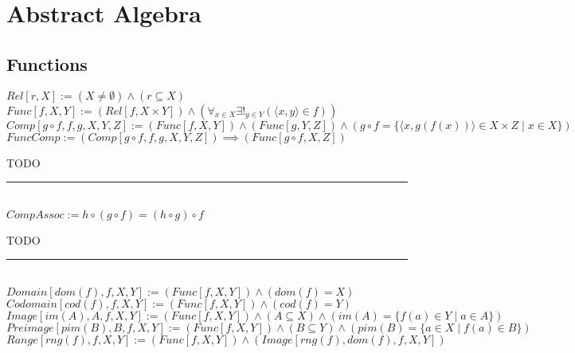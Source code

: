 \documentclass{book}
\newcommand{\abr}{:=}
\newcommand{\st}{\mathbin{|}}
\newcommand{\utup}[1]{\{#1\}}
\begin{document}
\begin{comment}
$ComponentEquiv \abr ((Component[W, G]) \land (x \in W)) \implies
\left(\begin{array}{ll}
  (W = \{y \in V(G) \st \exists_{P, V}(PathXY[P, (x, y), V, G])\}) \hfill \land \hfill \\
  (W = \{y \in V(G) \st d(x, y) \in \mathbb{N}\}) \hfill \land \hfill \\
  ((R = \{\langle u, v \rangle \st \utup{u, v} \in E(G)\}) \land (W = [x]_R)) \\
\end{array}\right)$ \\
\end{comment}



\newpage
\newpage
\newpage


\chapter{Abstract Algebra}
\section{Functions}
$Rel[r, X] \abr (X \neq \emptyset) \land (r \subseteq X)$ \\
$Func[f, X, Y] \abr (Rel[f, X \times Y]) \land (\forall_{x \in X} \exists!_{y \in Y}(\langle x, y \rangle \in f))$ \\
$Comp[g \circ f, f, g, X, Y, Z] \abr (Func[f, X, Y]) \land (Func[g, Y, Z]) \land (g \circ f = \{\langle x, g(f(x)) \rangle \in X \times Z \st x \in X\})$ \\

$FuncComp \abr (Comp[g \circ f, f, g, X, Y, Z]) \implies (Func[g \circ f, X, Z])$
\begin{enumerate}
  \lit TODO
\end{enumerate} \vspace{.75mm} \hrule \vspace{.75mm} \ \\

$CompAssoc \abr h \circ (g \circ f) = (h \circ g) \circ f$
\begin{enumerate}
  \lit TODO
\end{enumerate} \vspace{.75mm} \hrule \vspace{.75mm} \ \\

$Domain[dom(f), f, X, Y] \abr (Func[f, X, Y]) \land (dom(f) = X)$ \\
$Codomain[cod(f), f, X, Y] \abr (Func[f, X, Y]) \land (cod(f) = Y)$ \\
$Image[im(A), A, f, X, Y] \abr (Func[f, X, Y]) \land (A \subseteq X) \land (im(A) = \{f(a) \in Y \st a \in A\})$ \\
$Preimage[pim(B), B, f, X, Y] \abr (Func[f, X, Y]) \land (B \subseteq Y) \land (pim(B) = \{a \in X \st f(a) \in B\})$ \\
$Range[rng(f), f, X, Y] \abr (Func[f, X, Y]) \land (Image[rng(f), dom(f), f, X, Y])$ \\
\end{document}
